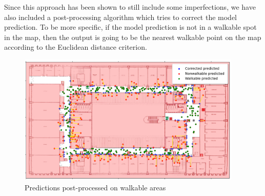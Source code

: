 Since this approach has been shown to still include some imperfections, we have also included a post-processing algorithm which tries to correct the model prediction. To be more specific, if the model prediction is not in a walkable spot in the map, then the output is going to be the nearest walkable point on the map according to the Euclidean distance criterion.
\begin{figure}[htbp]
    \begin{center}
        \includegraphics[width=0.95\textwidth]{./imgs/walkable_postprocess.png}
    \end{center}
    \caption{Predictions post-processed on walkable areas}
    \label{fig:trajectory-mapnet-walkable}
\end{figure}

